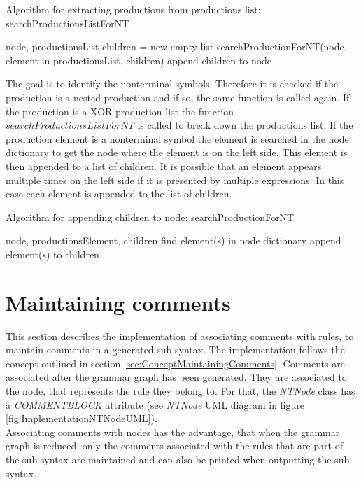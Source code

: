 \begin{algorithm}[H]
\caption{Algorithm for extracting productions from productions list: searchProductionsListForNT}
\begin{algorithmic}[1] 
\Require node, productionsList
	\State children = new empty list
	\State searchProductionForNT(node, element in productionsList, children)
	\State append children to node
\EndFor
\end{algorithmic}
\end{algorithm}

The goal is to identify the nonterminal symbols.
Therefore it is checked if the production is a nested production and if so, the same function is called again.
If the production is a XOR production list the function $searchProductionsListForNT$ is called to break down the productions list.
If the production element is a nonterminal symbol the element is searched in the node dictionary to get the node where the element is on the left side.
This element is then appended to a list of children. It is possible that an element appears multiple times on the left side if it is presented by multiple expressions.
In this case each element is appended to the list of children.

\begin{algorithm}[H]
\caption{Algorithm for appending children to node: searchProductionForNT}
\begin{algorithmic}[1] 
\Require node, productionsElement, children
		\State find element(s) in node dictionary
		\State append element(s) to children
	\EndIf
\EndFor
\end{algorithmic}
\end{algorithm}
\section{Maintaining comments}\label{sec:ImplementationMaintainingComments}
This section describes the implementation of associating comments with rules, to maintain comments in a generated sub-syntax.
The implementation follows the concept outlined in section \ref{sec:ConceptMaintainingComments}.
Comments are associated after the grammar graph has been generated.
They are associated to the node, that represents the rule they belong to.
For that, the \textit{NTNode} class has a \textit{COMMENT\textunderscore BLOCK} attribute (see \textit{NTNode} UML diagram in figure \ref{fig:ImplementationNTNodeUML}).\\
Associating comments with nodes has the advantage, that when the grammar graph is reduced, only the comments associated with the rules that are part of the sub-syntax are maintained and can also be printed when outputting the sub-syntax.\\


